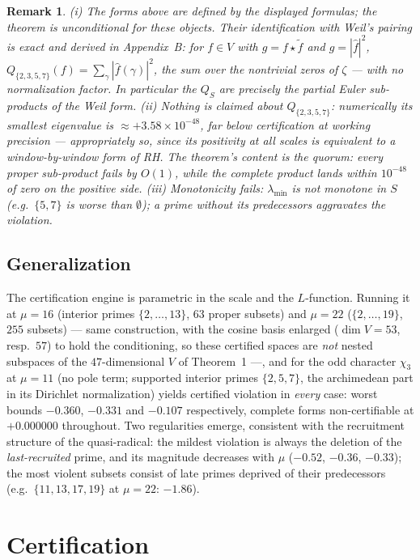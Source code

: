 \documentclass[10pt]{article}
\newtheorem*{remark}{Remark}
\begin{document}
\begin{remark}
(i) The forms above are \emph{defined} by the displayed formulas; the
theorem is unconditional for these objects. Their identification with
Weil's pairing is exact and derived in Appendix~B: for $f\in V$ with
$g=f\star\tilde f$ and $\hat g=|\hat f|^2$,
$Q_{\{2,3,5,7\}}(f)=\sum_\gamma|\hat f(\gamma)|^2$, the sum over the
nontrivial zeros of $\zeta$ --- with no normalization factor. In
particular the $Q_S$ are precisely the partial Euler sub-products of the
Weil form.
(ii) Nothing is claimed about $Q_{\{2,3,5,7\}}$: numerically its smallest
eigenvalue is $\approx+3.58\times10^{-48}$, far below certification at
working precision --- appropriately so, since its positivity at all scales
is equivalent to a window-by-window form of RH. The theorem's content is
the \emph{quorum}: every proper sub-product fails by $O(1)$, while the
complete product lands within $10^{-48}$ of zero on the positive side.
(iii) Monotonicity fails: $\lambda_{\min}$ is not monotone in $S$
(e.g.\ $\{5,7\}$ is worse than $\emptyset$); a prime without its
predecessors aggravates the violation.
\end{remark}

\subsection*{Generalization}
The certification engine is parametric in the scale and the $L$-function.
Running it at $\mu=16$ (interior primes $\{2,\dots,13\}$, $63$ proper
subsets) and $\mu=22$ ($\{2,\dots,19\}$, $255$ subsets) --- same
construction, with the cosine basis enlarged ($\dim V=53$, resp.\ $57$)
to hold the conditioning, so these certified spaces are \emph{not}
nested subspaces of the $47$-dimensional $V$ of Theorem~1 ---, and for the odd
character $\chi_3$ at $\mu=11$ (no pole term; supported interior primes
$\{2,5,7\}$, the archimedean part in its Dirichlet normalization) yields
certified violation in \emph{every} case: worst bounds $-0.360$, $-0.331$
and $-0.107$ respectively, complete forms non-certifiable at $+0.000000$
throughout. Two regularities emerge, consistent with the recruitment
structure of the quasi-radical: the mildest violation is always the
deletion of the \emph{last-recruited} prime, and its magnitude decreases
with $\mu$ ($-0.52$, $-0.36$, $-0.33$); the most violent subsets consist
of late primes deprived of their predecessors (e.g.\ $\{11,13,17,19\}$
at $\mu=22$: $-1.86$).

\section{Certification}
\end{document}
